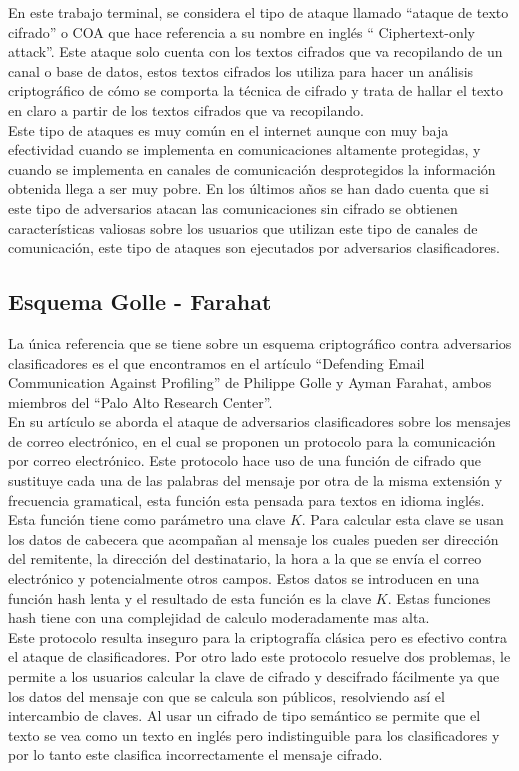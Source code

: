 \documentclass[12pt,oneside,onecolumn,openany]{report}
\begin{document}
En este trabajo terminal, se considera el tipo de ataque llamado “ataque  de  texto  cifrado” o COA  que  hace  referencia  a  su  nombre  en  inglés “
Ciphertext-only  attack”\cite{Ciphertextonly}.  Este ataque  solo  cuenta  con  los  textos  cifrados  que  va  recopilando  de  un  canal  o  base  de 
datos,  estos  textos  cifrados  los  utiliza  para  hacer  un  análisis  criptográfico  de  cómo  se comporta la técnica de cifrado  y trata de hallar el texto en claro a partir de los textos cifrados que va recopilando. 
\\
Este  tipo  de  ataques  es  muy  común  en  el  internet  aunque  con  muy  baja  efectividad cuando   se   implementa   en   comunicaciones   altamente   protegidas,   y   cuando   se 
implementa en canales de comunicación desprotegidos  la  información obtenida  llega  a ser  muy  pobre.  En  los  últimos  años  se  han  dado  cuenta  que  si   este  tipo  de 
adversarios   atacan las  comunicaciones  sin  cifrado se  obtienen  características  valiosas  sobre  los usuarios  que  utilizan  este  tipo  de  canales  de  comunicación,  este  tipo  de  ataques  son 
ejecutados por  adversarios clasificadores.\\


\subsection{Esquema Golle - Farahat}
La  única  referencia  que se tiene  sobre  un  esquema  criptográfico  contra  adversarios clasificadores es el que encontramos en el artículo 
“Defending Email Communication Against Profiling” de Philippe Golle  y  Ayman  Farahat, ambos  miembros del 
“Palo Alto Research Center”.\cite{Attacks}\\
En su artículo se aborda el ataque de adversarios clasificadores sobre los mensajes de correo electrónico, en el cual se proponen un protocolo para la comunicación por correo electrónico. Este protocolo hace uso de una función  de cifrado que sustituye cada una de las palabras del mensaje por otra de la misma extensión y frecuencia gramatical, esta función esta pensada para textos en idioma ingl\'es. 
Esta función tiene como parámetro una clave $K$.  Para calcular esta clave se usan los datos de cabecera que acompañan al mensaje los cuales pueden ser dirección  del remitente, la dirección del destinatario, la hora a la que se envía el correo electrónico y potencialmente otros campos. Estos datos se introducen en una función hash lenta y el resultado de esta función es la clave $K$. Estas funciones hash  tiene con una complejidad de calculo moderadamente mas alta.  \\
Este  protocolo resulta inseguro para la criptografía clásica pero es efectivo contra el ataque de clasificadores. Por otro lado este protocolo resuelve dos problemas, le  permite  a los usuarios  calcular  la  clave de cifrado y descifrado  fácilmente  ya  que  los datos del mensaje con que se calcula son  públicos, resolviendo así el intercambio de claves. Al usar un cifrado de tipo semántico se permite que el texto se vea como un texto en inglés pero indistinguible para los clasificadores y por lo tanto este clasifica incorrectamente el mensaje cifrado.\\
\end{document}
